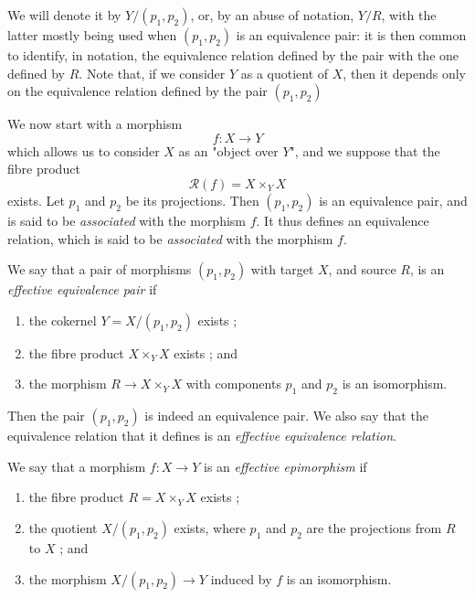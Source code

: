   We will denote it by \(Y/(p_1,p_2)\), or, by an abuse of notation, \(Y/R\), with the latter mostly being used when \((p_1,p_2)\) is an equivalence pair: it is then common to identify, in notation, the equivalence relation defined by the pair with the one defined by \(R\).
  Note that, if we consider \(Y\) as a quotient of \(X\), then it depends only on the equivalence relation defined by the pair \((p_1,p_2)\)\par{}We now start with a morphism
  \[     f\colon  X\to  Y   \]
  which allows us to consider \(X\) as an "object over \(Y\)", and we suppose that the fibre product
  \[     \mathcal {R}(f)     = X\times _Y X   \]
  exists.
  Let \(p_1\) and \(p_2\) be its projections.
  Then \((p_1,p_2)\) is an equivalence pair, and is said to be \emph{associated} with the morphism \(f\).
  It thus defines an equivalence relation, which is said to be \emph{associated} with the morphism \(f\).\par{}We say that a pair of morphisms \((p_1,p_2)\) with target \(X\), and source \(R\), is an \emph{effective equivalence pair} if

  
 \begin{enumerate}
    
 \item[i.]
      the cokernel \(Y=X/(p_1,p_2)\) exists ;
    

    
 \item[ii.]
      the fibre product \(X\times _Y X\) exists ; and
    

    
 \item[iii.]
      the morphism \(R\to  X\times _Y X\) with components \(p_1\) and \(p_2\) is an isomorphism.
    

  \end{enumerate}


  Then the pair \((p_1,p_2)\) is indeed an equivalence pair.
  We also say that the equivalence relation that it defines is an \emph{effective equivalence relation}.\par{}We say that a morphism \(f\colon  X\to  Y\) is an \emph{effective epimorphism} if

  
 \begin{enumerate}
    
 \item[i.]
      the fibre product \(R=X\times _Y X\) exists ;
    

    
 \item[ii.]
      the quotient \(X/(p_1,p_2)\) exists, where \(p_1\) and \(p_2\) are the projections from \(R\) to \(X\) ; and
    

    
 \item[iii.]
      the morphism \(X/(p_1,p_2)\to  Y\) induced by \(f\) is an isomorphism.
    

  \end{enumerate}


